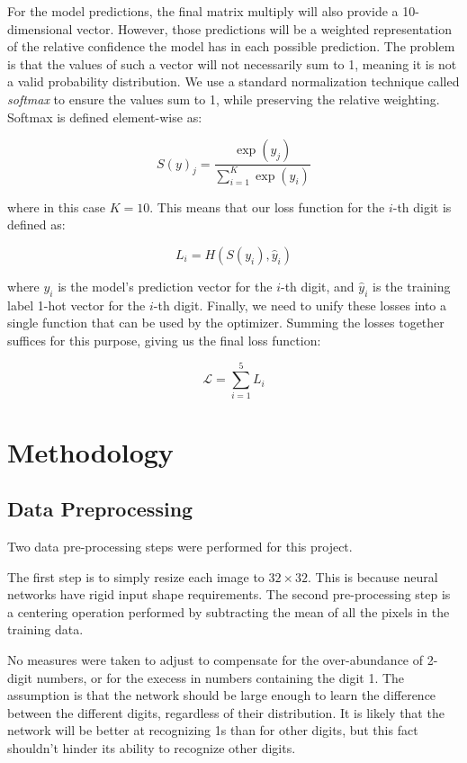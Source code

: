 \documentclass[12pt]{article}
\begin{document}
For the model predictions, the final matrix multiply will also provide a 10-dimensional vector.
However, those predictions will be a weighted representation of the relative confidence the model has in each possible prediction.
The problem is that the values of such a vector will not necessarily sum to 1, meaning it is not a valid probability distribution.
We use a standard normalization technique called \textit{softmax} to ensure the values sum to 1, while preserving the relative weighting.
Softmax is defined element-wise as:

\begin{equation}
	S(y)_j = \frac{\exp(y_j)}{\sum_{i=1}^K \exp(y_i)}
\end{equation}

where in this case $K=10$.
This means that our loss function for the $i$-th digit is defined as:

\begin{equation}
	L_i = H(S(y_i), \hat{y}_i)
\end{equation}

where $y_i$ is the model's prediction vector for the $i$-th digit, and $\hat{y}_i$ is the training label 1-hot vector for the $i$-th digit.
Finally, we need to unify these losses into a single function that can be used by the optimizer.
Summing the losses together suffices for this purpose, giving us the final loss function:

\begin{equation}
	\mathcal{L} = \sum_{i=1}^5 L_i
\end{equation}

\section{Methodology}
\subsection{Data Preprocessing}
Two data pre-processing steps were performed for this project. 

The first step is to simply resize each image to $32 \times 32$. This is because neural networks have rigid input shape requirements. The second pre-processing step is a centering operation performed by subtracting the mean of all the pixels in the training data. 

No measures were taken to adjust to compensate for the over-abundance of 2-digit numbers, or for the execess in numbers containing the digit 1. The assumption is that the network should be large enough to learn the difference between the different digits, regardless of their distribution. It is likely that the network will be better at recognizing 1s than for other digits, but this fact shouldn't hinder its ability to recognize other digits.
\end{document}
